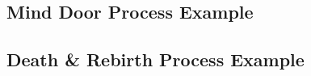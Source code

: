 \documentclass[a4 paper, 12pt]{article}
\begin{document}
\pagebreak

\subsection*{Mind Door Process Example}

\begin{center}

\end{center}

\vspace{10mm}

\subsection*{Death \& Rebirth Process Example}

\begin{center}

\end{center}
\end{document}
